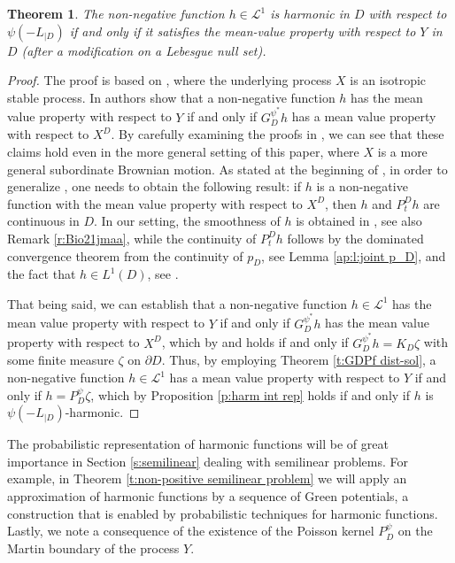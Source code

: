 \documentclass[12pt,a4paper,onecolumn]{article}
\newtheorem{thm}{Theorem}[section]
\theoremstyle{definition}
\newcommand{\1}{\mathbf 1}
\newcommand{\calL}{\mathcal{L}^1}
\newcommand{\Lo}{\psi(-L_{|D})}
\newcommand{\GDPs}{G_D^{\psi^*}}
\newcommand{\PDS}{P^{\psi}_{ D}}
\numberwithin{equation}{section}
\begin{document}
	\begin{thm}\label{t:1627}
		The non-negative function $h\in \calL$ is harmonic in $D$ with respect to $\Lo$
		if and only if it satisfies the mean-value property with respect to $Y$ in $D$ (after a modification on a Lebesgue null set).
	\end{thm}
	
	\begin{proof}
	The proof is based on \cite{SongVondracek2006potenSpecial}, where the underlying process $X$ is an isotropic stable process. In \cite[Theorem 3.6]{SongVondracek2006potenSpecial} authors show  that a non-negative function $h$ has the mean value property with respect to $Y$ if and only if $\GDPs h$ has a mean value property with respect to $X^D$. By carefully examining the proofs in \cite{SongVondracek2006potenSpecial}, we can see that these claims hold even in the more general setting of this paper, where $X$ is a more general subordinate Brownian motion. As stated at the beginning of \cite[Section 3]{SongVondracek2006potenSpecial}, in order to generalize \cite[Theorem 3.6]{SongVondracek2006potenSpecial}, one needs to obtain the following result: if $h$ is a non-negative function with the mean value property with respect to $X^D$, then $h$ and $P^D_t h$ are continuous in $D$. In our setting, the smoothness of $h$ is obtained in \cite[Theorem 3.12]{Bio21jmaa}, see also Remark \ref{r:Bio21jmaa}, while the continuity of $P^D_t h$ follows by the dominated convergence theorem from the continuity of  $p_D$, see Lemma \ref{ap:l:joint p_D}, and the fact that $h\in L^1(D)$, see \cite[Lemma 3.8]{Bio21jmaa}. 

        
		That being said,  we can establish that  a non-negative function $h\in \calL$  has the mean value property with respect to $Y$ if and only if $\GDPs h$ has the mean value property with respect to $X^D$, which by \cite[Proposition 5.11]{Bio21jmaa} and \cite[Eq. (4.24)]{BVW-na21} holds if and only if $\GDPs h=K_D\zeta$ with some finite measure $\zeta$ on $\partial D$.  Thus, by employing Theorem \ref{t:GDPf dist-sol}, a non-negative function $h\in \calL$ has a mean value property with respect to $Y$ if and only if $h=\PDS \zeta$, which by Proposition \ref{p:harm int rep} holds if and only if $h$ is $\Lo$-harmonic.
	\end{proof}
	
	The probabilistic representation of harmonic functions will be of great importance in Section \ref{s:semilinear} dealing with semilinear problems. For example, in Theorem \ref{t:non-positive semilinear problem} we will apply an approximation of harmonic functions by a sequence of Green potentials, a construction that is enabled by probabilistic techniques for harmonic functions.  Lastly, we note a consequence of the existence of the Poisson kernel $\PDS$ on the Martin boundary of the process $Y$.
\end{document}
